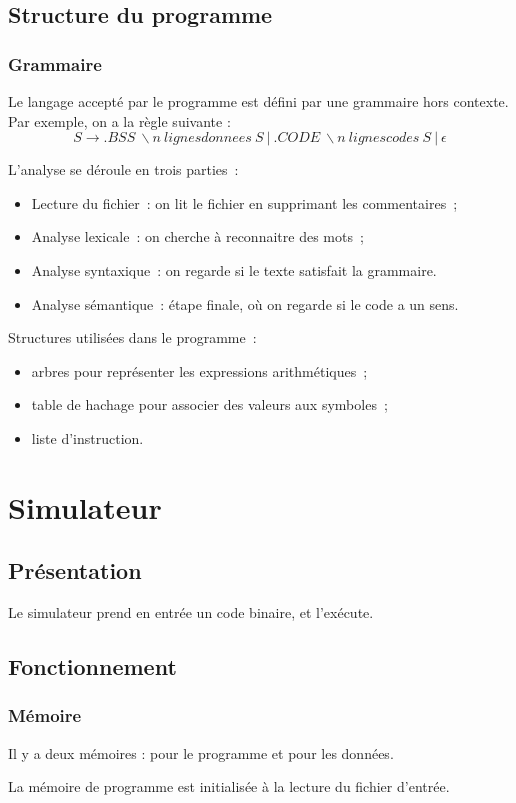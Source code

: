 \documentclass{beamer}
\begin{document}
\subsection{Structure du programme}
\begin{frame}
\frametitle{Grammaire}
Le langage accepté par le programme est défini par une grammaire hors contexte.
Par exemple, on a la règle suivante :
\[ S \rightarrow .BSS\ \backslash n\ lignesdonnees\ S\ |\ .CODE\ \backslash n\ lignescodes\ S\ |\ \epsilon \]
\end{frame}

\begin{frame}
L'analyse se déroule en trois parties~:
\begin{itemize}
\item Lecture du fichier~: on lit le fichier en supprimant les commentaires~;
\item Analyse lexicale~: on cherche à reconnaitre des mots~;
\item Analyse syntaxique~: on regarde si le texte satisfait la grammaire.
\item Analyse sémantique~: étape finale, où on regarde si le code a un sens.
\end{itemize}
\end{frame}

\begin{frame}
Structures utilisées dans le programme~:
\begin{itemize}
\item arbres pour représenter les expressions arithmétiques~;
\item table de hachage pour associer des valeurs aux symboles~;
\item liste d'instruction.
\end{itemize}
\end{frame}

\section{Simulateur}
\subsection{Présentation}
\begin{frame}
Le simulateur prend en entrée un code binaire, et l'exécute.
\end{frame}

\subsection{Fonctionnement}
\begin{frame}
\frametitle{Mémoire}
	Il y a deux mémoires : pour le programme et pour les données.
	
	La mémoire de programme est initialisée à la lecture du fichier d'entrée.
\end{frame}
\end{document}
